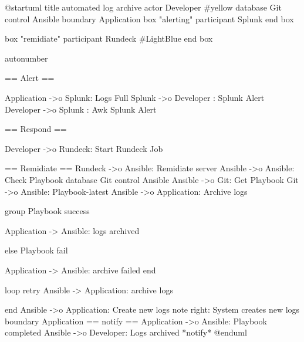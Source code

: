 @startuml
title automated log archive
actor Developer #yellow
database Git
control Ansible
boundary Application
box "alerting"
  participant Splunk
end box

box "remidiate"
  participant Rundeck #LightBlue
end box

autonumber

== Alert ==

Application ->o Splunk: Logs Full
Splunk ->o Developer : Splunk Alert
Developer ->o Splunk : Awk Splunk Alert

== Respond ==

Developer ->o Rundeck: Start Rundeck Job

== Remidiate ==
Rundeck ->o Ansible: Remidiate server
Ansible ->o Ansible: Check Playbook
database Git
control Ansible
Ansible ->o Git: Get Playbook
Git ->o Ansible: Playbook-latest
Ansible ->o Application: Archive logs

group Playbook success

  Application -> Ansible: logs archived

else Playbook fail

  Application -> Ansible: archive failed
end

loop retry
  Ansible -> Application: archive logs

end
Ansible ->o Application: Create new logs
note right: System creates new logs
boundary Application
== notify ==
Application ->o Ansible: Playbook completed
Ansible ->o Developer: Logs archived *notify*
@enduml
